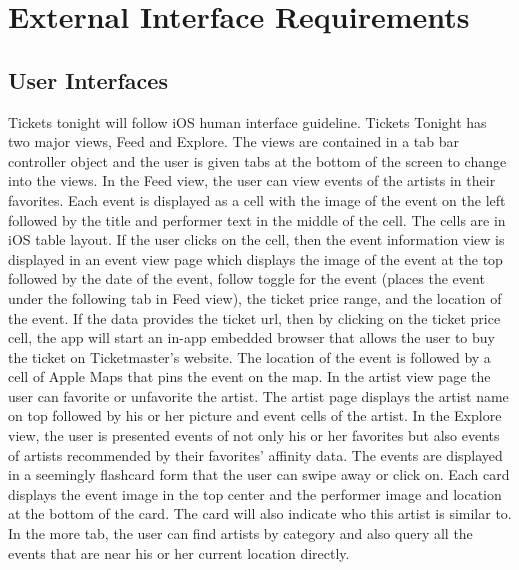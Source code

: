 \section{External Interface Requirements}
	\subsection{User Interfaces}
		Tickets tonight will follow iOS human interface guideline. Tickets Tonight has two major views, Feed 
		and Explore. The views are contained in a tab bar controller object and the user is given tabs at the 
		bottom of the screen to change into the views. In the Feed view, the user can view events of the artists 
		in their favorites. Each event is displayed as a cell with the image of the event on the left followed by the 
		title and performer text in the middle of the cell. The cells are in iOS table layout. If the user clicks on 
		the cell, then the event information view is displayed in an event view page which displays the image of 
		the event at the top followed by the date of the event, follow toggle for the event (places the event under 
		the following tab in Feed view), the ticket price range, and the location of the event. If the data provides 
		the ticket url, then by clicking on the ticket price cell, the app will start an in-app embedded browser 
		that allows the user to buy the ticket on Ticketmaster’s website. The location of the event is followed by 
		a cell of Apple Maps that pins the event on the map. In the artist view page the user can favorite or 
		unfavorite the artist. The artist page displays the artist name on top followed by his or her picture and 
		event cells of the artist. In the Explore view, the user is presented events of not only his or her favorites 
		but also events of artists recommended by their favorites’ affinity data. The events are displayed in a 
		seemingly flashcard form that the user can swipe away or click on. Each card displays the event image in 
		the top center and the performer image and location at the bottom of the card. The card will also 
		indicate who this artist is similar to. In the more tab, the user can find artists by category and also query 
		all the events that are near his or her current location directly.
		
